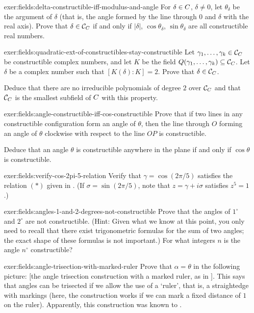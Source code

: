 \begin{exer}{}{exer:fields:delta-constructible-iff-modulus-and-angle}
  For $\delta \in C$, $\delta \neq 0$, let $\theta_\delta$ be the
  argument of $\delta$ (that is, the angle formed by the line through
  $0$ and $\delta$ with the real axis). Prove that
  $\delta \in \mathcal{C}_{C}$ if and only if $|\delta|$,
  $\cos\theta_\delta$, $\sin\theta_\delta$ are all constructible real
  numbers.
\end{exer}
\begin{exer}{}{exer:fields:quadratic-ext-of-constructibles-stay-constructible}
  Let $\gamma_1, \dots, \gamma_k \in \mathcal{C}_{C}$ be
  constructible complex numbers, and let $K$ be the field
  $Q(\gamma_1, \dots, \gamma_k) \subseteq \mathcal{C}_{C}$. Let
  $\delta$ be a complex number such that $[K(\delta) : K] = 2$. Prove
  that $\delta \in \mathcal{C}_{C}$.

  Deduce that there are no irreducible polynomials of degree $2$ over
  $\mathcal{C}_{C}$ and that $\mathcal{C}_{C}$ is the smallest
  subfield of $C$ with this property.
\end{exer}
\begin{exer}{}{exer:fields:angle-constructible-iff-cos-constructible}
  Prove that if two lines in any constructible configuration form an
  angle of $\theta$, then the line through $O$ forming an angle of
  $\theta$ clockwise with respect to the line $OP$ is constructible.

  Deduce that an angle $\theta$ is constructible anywhere in the plane
  if and only if $\cos\theta$ is constructible.
\end{exer}
\begin{exer}{}{exer:fields:verify-cos-2pi-5-relation}
  Verify that $\gamma = \cos(2\pi/5)$ satisfies the relation $(*)$
  given in
  . (If
  $\sigma = \sin(2\pi/5)$, note that $z = \gamma + i\sigma$ satisfies
  $z^5 = 1$.)
\end{exer}
\begin{exer}{}{exer:fields:angles-1-and-2-degrees-not-constructible}
  Prove that the angles of $1^\circ$ and $2^\circ$ are not
  constructible.  (Hint: Given what we know at this point, you only
  need to recall that there exist trigonometric formulas for the sum
  of two angles; the exact shape of these formulas is not important.)
  For what integers $n$ is the angle $n^\circ$ constructible?
\end{exer}
\begin{exer}{}{exer:fields:angle-trisection-with-marked-ruler}
  Prove that $\alpha = \theta$ in the following picture: [the angle
  trisection construction with a marked ruler, as in
  ]. This
  says that angles can be trisected if we allow the use of a `ruler',
  that is, a straightedge with markings (here, the construction works
  if we can mark a fixed distance of $1$ on the ruler). Apparently,
  this construction was known to .
\end{exer}
